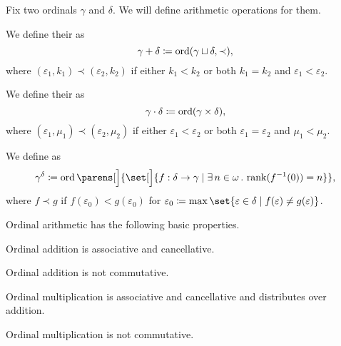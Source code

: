 \begin{definition}\label{def:ordinal_arithmetic}
  Fix two ordinals \( \gamma \) and \( \delta \). We will define arithmetic operations for them.

  \begin{thmenum}
     We define their  as
    \begin{equation*}
      \gamma + \delta \coloneqq \operatorname{ord}(\gamma \sqcup \delta, \prec),
    \end{equation*}
    where \( (\varepsilon_1, k_1) \prec (\varepsilon_2, k_2) \) if either \( k_1 < k_2 \) or both \( k_1 = k_2 \) and \( \varepsilon_1 < \varepsilon_2 \).

     We define their  as
    \begin{equation*}
      \gamma \cdot \delta \coloneqq \operatorname{ord}(\gamma \times \delta),
    \end{equation*}
    where \( (\varepsilon_1, \mu_1) \prec (\varepsilon_2, \mu_2) \) if either \( \varepsilon_1 < \varepsilon_2 \) or both \( \varepsilon_1 = \varepsilon_2 \) and \( \mu_1 < \mu_2 \).

     We define  as
    \begin{equation*}
      \gamma^\delta \coloneqq \ord\parens[\Big]{ \set[\Big]{ f: \delta \to \gamma \given \qexists {n \in \omega} \rank(f^{-1}(0)) = n } },
    \end{equation*}
    where \( f \prec g \) if \( f(\varepsilon_0) < g(\varepsilon_0) \) for \( \varepsilon_0 \coloneqq \max\set{ \varepsilon \in \delta \given f(\varepsilon) \neq g(\varepsilon) } \).
  \end{thmenum}
\end{definition}

\begin{proposition}\label{thm:ordinal_arithmetic_properties}
  Ordinal arithmetic has the following basic properties.

  \begin{thmenum}
     Ordinal addition is associative and cancellative.

    \medskip

     Ordinal addition is not commutative.

    \medskip

     Ordinal multiplication is associative and cancellative and distributes over addition.

    \medskip

     Ordinal multiplication is not commutative.
  \end{thmenum}
\end{proposition}
